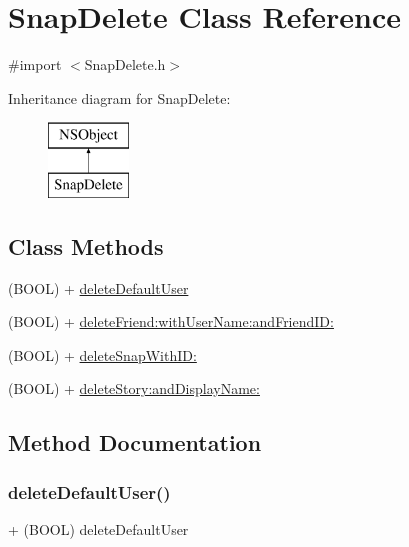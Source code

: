 \hypertarget{interface_snap_delete}{}\section{Snap\+Delete Class Reference}
\label{interface_snap_delete}


{\ttfamily \#import $<$Snap\+Delete.\+h$>$}

Inheritance diagram for Snap\+Delete\+:\begin{figure}[H]
\begin{center}
\leavevmode
\includegraphics[height=2.000000cm]{interface_snap_delete}
\end{center}
\end{figure}
\subsection*{Class Methods}
\begin{DoxyCompactItemize}
\item 
(B\+O\+OL) + \hyperlink{interface_snap_delete_a21a929e5506c85e10170a460b7b4d9f7}{delete\+Default\+User}
\item 
(B\+O\+OL) + \hyperlink{interface_snap_delete_aeff47c1ac973a925794c4a8ba9752b67}{delete\+Friend\+:with\+User\+Name\+:and\+Friend\+I\+D\+:}
\item 
(B\+O\+OL) + \hyperlink{interface_snap_delete_ab162fbe8f22b3cc98556083382196901}{delete\+Snap\+With\+I\+D\+:}
\item 
(B\+O\+OL) + \hyperlink{interface_snap_delete_a51fc8d13f55334e8b1d7e8eb14b32932}{delete\+Story\+:and\+Display\+Name\+:}
\end{DoxyCompactItemize}


\subsection{Method Documentation}
\hypertarget{interface_snap_delete_a21a929e5506c85e10170a460b7b4d9f7}{}\label{interface_snap_delete_a21a929e5506c85e10170a460b7b4d9f7} 
\subsubsection{\texorpdfstring{delete\+Default\+User()}{deleteDefaultUser()}}
{\footnotesize\ttfamily + (B\+O\+OL) delete\+Default\+User \begin{DoxyParamCaption}{ }\end{DoxyParamCaption}}


